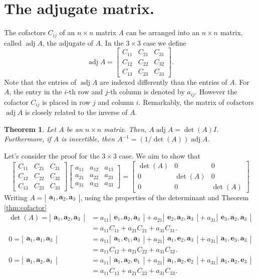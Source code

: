 \documentclass[12pt]{article}
\newcommand{\ba}{\mathbf{a}}
\newcommand{\be}{\mathbf{e}}
\newcommand{\adj}{\operatorname{adj}}
\newcommand{\bmat}[1]{\begin{bmatrix}#1\end{bmatrix}}
\newcommand{\vmat}[1]{\left|\begin{matrix}#1\end{matrix}\right|}
\newtheorem{theorem}{Theorem}
\begin{document}
\section{The adjugate matrix.}
The cofactors $C_{ij}$ of an $n\times n$ matrix $A$ can be arranged
into an $n\times n$ matrix, called $\adj A$, the adjugate of $A$.  In
the $3\times 3$ case we define
\[ \adj A =  \bmat{C_{11} & C_{21} & C_{31} \\ C_{12} & C_{22} & C_{32}\\
    C_{13} & C_{23} & C_{33} } .\]
Note that the entries of $\adj A$ are indexed differently than the
entries of $A$.  For $A$, the entry in the $i$-th row and $j$-th
column is denoted by $a_{ij}$.  However the cofactor $C_{ij}$ is
placed in row $j$ and column $i$.  Remarkably, the matrix of cofactors
$\adj A$ is closely related to the inverse of $A$.
\begin{theorem}
  Let $A$ be an $n\times n$ matrix.  Then, $A \adj A = \det(A) I$.
  Furthermore, if $A$ is invertible, then $A^{-1} = (1/\det(A)) \adj
  A$.  
\end{theorem}
\noindent Let's consider the proof for the $3\times 3$ case.  We aim
to show that
\[ 
\bmat{C_{11} & C_{21} & C_{31} \\ C_{12} & C_{22} & C_{32}\\
  C_{13} & C_{23} & C_{33} } \bmat{a_{11} & a_{12} & a_{13} \\
  a_{21} & a_{22} & a_{23}\\
  a_{31} & a_{32} & a_{33} } =
\bmat{\det(A)&0&0\\0&\det(A)&0\\0&0&\det(A)}\] Writing $A=\vmat{\ba_1,
  \ba_2, \ba_3}$, using the properties of the determinant and Theorem
\ref{thm:cofactor}
\begin{align*}
  \det(A)=\vmat{ \ba_1, \ba_2, \ba_3} &= a_{11} \vmat{ \be_1,\ba_2,
    \ba_3} +
  a_{21}  \vmat{ \be_2,\ba_2, \ba_3} + a_{31} \vmat{\be_3,\ba_2, \ba_3}\\
  &=a_{11} C_{11} + a_{21} C_{21} + a_{31} C_{31} .\\
  0=\vmat{ \ba_1, \ba_1, \ba_3} &= a_{11} \vmat{ \ba_1,\be_1, \ba_3} +
  a_{21} \vmat{
    \ba_1,\be_2, \ba_3} + a_{31} \vmat{\ba_1,\be_3, \ba_3}\\
  &=a_{11} C_{12} + a_{21} C_{22} + a_{31} C_{32} .\\
  0=\vmat{ \ba_1, \ba_2, \ba_1} &= a_{11} \vmat{ \ba_1,\ba_2,\be_1} +
  a_{21} \vmat{
    \ba_1,\ba_2,\be_2} + a_{31} \vmat{\ba_1,\ba_2,\be_3}\\
  &=a_{11} C_{13} + a_{21} C_{23} + a_{31} C_{33} .
\end{align*}
\end{document}
